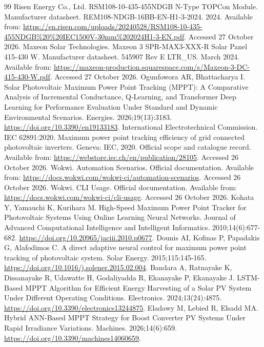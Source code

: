 \documentclass[Acad.Energy.,researcharticle,9pt,twoside,oneauthor]{Definitions/jams_academia}
\begin{document}
\begin{thebibliography}{99}
 Risen Energy Co., Ltd. RSM108-10-435-455NDGB N-Type TOPCon Module. Manufacturer datasheet. REM108-NDGB-16BB-EN-H1-3-2024. 2024. Available from: \url{https://en.risen.com/uploads/20240528/RSM108-10-435-455NDGB%20%20IEC1500V-30mm%202024H1-3-EN.pdf}. Accessed 27 October 2026.
 Maxeon Solar Technologies. Maxeon 3 SPR-MAX3-XXX-R Solar Panel 415-430 W. Manufacturer datasheet. 545907 Rev E LTR\_US. March 2024. Available from: \url{https://maxeon-production.squarespace.com/s/Maxeon-3-DC-415-430-W.pdf}. Accessed 27 October 2026.
 Ogunfowora AR, Bhattacharya I. Solar Photovoltaic Maximum Power Point Tracking (MPPT): A Comparative Analysis of Incremental Conductance, Q-Learning, and Transformer Deep Learning for Performance Evaluation Under Standard and Dynamic Environmental Scenarios. Energies. 2026;19(13):3183. \url{https://doi.org/10.3390/en19133183}.
 International Electrotechnical Commission. IEC 62891:2020. Maximum power point tracking efficiency of grid connected photovoltaic inverters. Geneva: IEC, 2020. Official scope and catalogue record. Available from: \url{https://webstore.iec.ch/en/publication/28105}. Accessed 26 October 2026.
 Wokwi. Automation Scenarios. Official documentation. Available from: \url{https://docs.wokwi.com/wokwi-ci/automation-scenarios}. Accessed 26 October 2026.
 Wokwi. CLI Usage. Official documentation. Available from: \url{https://docs.wokwi.com/wokwi-ci/cli-usage}. Accessed 26 October 2026.
 Kohata Y, Yamauchi K, Kurihara M. High-Speed Maximum Power Point Tracker for Photovoltaic Systems Using Online Learning Neural Networks. Journal of Advanced Computational Intelligence and Intelligent Informatics. 2010;14(6):677-682. \url{https://doi.org/10.20965/jaciii.2010.p0677}.
 Dounis AI, Kofinas P, Papadakis G, Alafodimos C. A direct adaptive neural control for maximum power point tracking of photovoltaic system. Solar Energy. 2015;115:145-165. \url{https://doi.org/10.1016/j.solener.2015.02.004}.
 Bandara A, Ratnayake K, Dissanayake R, Udawatte H, Godaliyadda R, Ekanayake P, Ekanayake J. LSTM-Based MPPT Algorithm for Efficient Energy Harvesting of a Solar PV System Under Different Operating Conditions. Electronics. 2024;13(24):4875. \url{https://doi.org/10.3390/electronics13244875}.
 Eladawy M, Lebied R, Elsadd MA. Hybrid ANN-Based MPPT Strategy for Boost Converter PV Systems Under Rapid Irradiance Variations. Machines. 2026;14(6):659. \url{https://doi.org/10.3390/machines14060659}.
\end{thebibliography}
\end{document}
